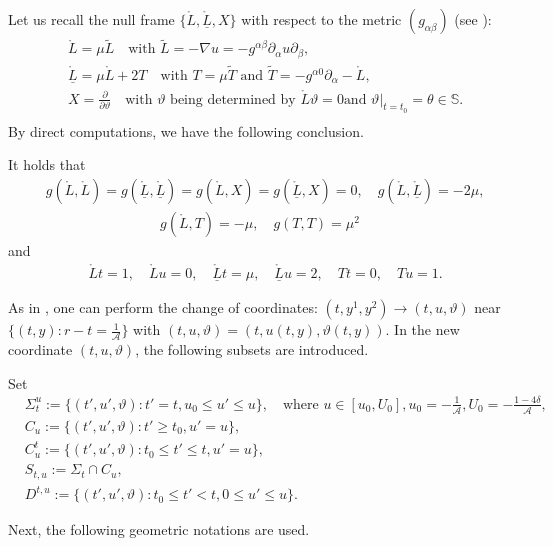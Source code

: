 \documentclass[11pt,twoside]{article}
\def\al{\alpha}
\def\be{\beta}
\def\na{\nabla}
\def\th{\theta}
\def\f{\frac}
\def\Lr{\mathring{L}}
\def\p{\partial}
\begin{document}
Let us recall the null frame $\{\mathring L, \mathring{\underline L}, X\}$ with respect to the metric $(g_{\al\beta})$
(see \cite{Ding2, Ding4}):
\begin{equation}\label{Lr}
\begin{split}	
&\Lr=\mu\tilde L\quad\text{with $\tilde L=-\na u=-g^{\al\be}\p_{\al}u\p_{\be}$},\\
&\mathring{\underline L}=\mu\mathring L+2T
\quad \text{with $T=\mu\tilde T$ and $\tilde T=-g^{\al 0}\p_\al-\mathring L$},\\
&X=\f{\p}{\p\vartheta}\quad\text{with $\vartheta$ being determined by $\mathring L\vartheta=0$
and $\vartheta|_{t=t_0}=\th\in\mathbb{S}$}.\\	
\end{split}
\end{equation}
By direct computations, we have the following conclusion.
\begin{lemma}\label{nullframe}
It holds that
\begin{align*}
&g(\mathring L,\mathring L)=g(\mathring{\underline L}, \mathring{\underline L})=g(\mathring L, X)=g(\mathring{\underline L}, X)=0,
\quad g(\mathring L, \mathring{\underline L})=-2\mu,
\end{align*}
\begin{align}\label{LTTT}
g(\mathring L, T)=-\mu,\quad g(T,T)=\mu^2
\end{align}
and
\begin{align}\label{T}
&\mathring L t=1,\quad\mathring L u=0, \quad \mathring{\underline L}t=\mu,\quad \mathring{\underline L} u=2, \quad Tt=0,\quad T u=1.
\end{align}
\end{lemma}


As in \cite{Sp,M-Y}, one can perform the change of coordinates:
$(t, y^1, y^2)\longrightarrow (t, u, \vartheta)$ near $\{(t,y): r-t = \frac 1{\mathcal A}\}$ with
$({t}, u, \vartheta)=(t, u(t,y), \vartheta(t,y))$.
In the new coordinate $({t}, u, \vartheta)$, the following subsets are introduced.
\begin{definition} Set
\begin{align*}
&\Sigma_{ t}^{u}:=\{({t}',u',\vartheta): {t}'= t, u_0\leq u'\leq u\},\quad\text{where $u\in [u_0, U_0], u_0=-\frac1{\mathcal A}, U_0=-\frac{1-4\delta}{\mathcal A}$},\\
&C_{u}:=\{({t}',u',\vartheta): {t}'\geq t_0, u'=u\},\\
&C_{u}^{t}:=\{({t}',u',\vartheta): t_0\leq {t}'\leq {t}, u'=u\},\\
&S_{{t}, u}:=\Sigma_{t}\cap C_{u},\\
&D^{{t}, u}:=\{({t}', u',\vartheta): t_0\leq {t}'<{t}, 0\leq u'\leq u\}.
\end{align*}
\end{definition}
Next, the following geometric notations are used.
\end{document}
